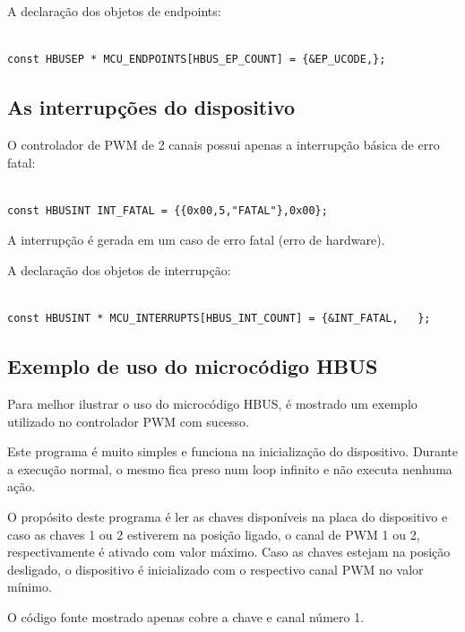 \documentclass[11pt]{report}
\begin{document}
A declaração dos objetos de endpoints:

\begin{verbatim}

const HBUSEP * MCU_ENDPOINTS[HBUS_EP_COUNT] = {&EP_UCODE,};

\end{verbatim}

\subsection{As interrupções do dispositivo}

O controlador de PWM de 2 canais possui apenas a interrupção básica de erro fatal:

\begin{verbatim}

const HBUSINT INT_FATAL = {{0x00,5,"FATAL"},0x00};

\end{verbatim}

A interrupção é gerada em um caso de erro fatal (erro de hardware).

A declaração dos objetos de interrupção:

\begin{verbatim}

const HBUSINT * MCU_INTERRUPTS[HBUS_INT_COUNT] = {&INT_FATAL,	};

\end{verbatim}

\subsection{Exemplo de uso do microcódigo HBUS}

Para melhor ilustrar o uso do microcódigo HBUS, é mostrado um exemplo utilizado no controlador PWM com sucesso.

Este programa é muito simples e funciona na inicialização do dispositivo. Durante a execução normal, o mesmo fica preso num loop infinito e não executa nenhuma ação.

O propósito deste programa é ler as chaves disponíveis na placa do dispositivo e caso as chaves 1 ou 2 estiverem na posição ligado, o canal de PWM 1 ou 2, respectivamente é ativado com valor máximo. Caso as chaves estejam na posição desligado, o dispositivo é inicializado com o respectivo canal PWM no valor mínimo.

O código fonte mostrado apenas cobre a chave e canal número 1.
\end{document}
